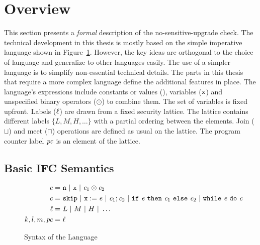 \section{Overview}
This section presents a \emph{formal} description of the
no-sensitive-upgrade check. The technical development in this thesis
is mostly based on the simple imperative language shown in
Figure~\ref{basic:syntax}. However, the key ideas are orthogonal to
the choice of language and generalize to 
other languages easily. The use of a simpler language is to simplify
non-essential technical details. The parts in this thesis that require
a more complex language define the additional features in place. 
The language's expressions include constants or values (),
variables ($\texttt{x}$) and unspecified binary operators ($\odot$) to 
combine them. The set of variables is fixed upfront. Labels ($\ell$)
are drawn from a fixed security lattice. The lattice contains
different labels $\{L, M, H, \ldots \}$ with a partial ordering
between the elements. Join ($\sqcup$) and meet ($\sqcap$) operations
are defined as usual on the lattice. The program counter label $\mathit{pc}$
is an element of the lattice.

\subsection{Basic IFC Semantics}
\begin{figure}
\begin{align*}
\mathit{e}	=~& \texttt{n}~\arrowvert~\texttt{x}~\arrowvert~\mathit{e}_1 \odot \mathit{e}_2 \\
\mathit{c}	=~& \texttt{skip}~\arrowvert~\texttt{x} := \mathit{e}~\arrowvert 
 ~\mathit{c}_1;\mathit{c}_2~\arrowvert~\texttt{if}~\mathit{e}~\texttt{then}~\mathit{c}_1~\texttt{else}~\mathit{c}_2~\arrowvert~\texttt{while}~\mathit{e}~\texttt{do}~\mathit{c}\\
\ell          =~& L~\arrowvert~M~\arrowvert~H~\arrowvert~\ldots\\
k,l,m, \mathit{pc} =~& \ell
\end{align*}
\caption{Syntax of the Language}\label{basic:syntax}
\end{figure}



